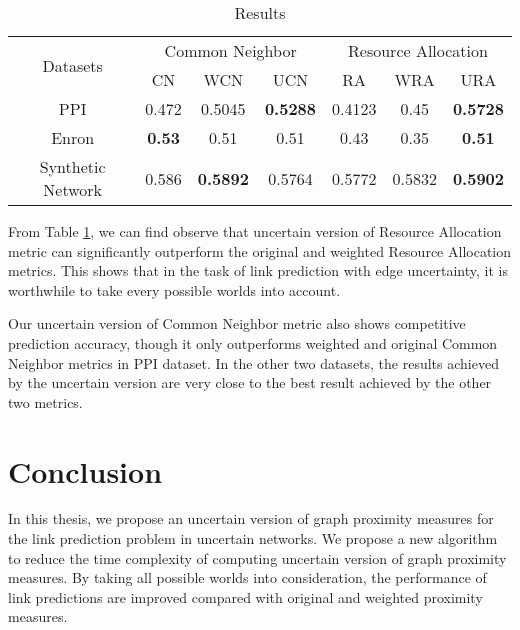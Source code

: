 \documentclass[\main/thesis.tex]{subfiles}
\begin{document}
\begin{table}[]
\centering
\caption{Results}
\label{experiment-result-link}
\begin{tabular}{c|c|c|c||c|c|c}
\hline
\multirow{2}{*}{Datasets} & \multicolumn{3}{c||}{Common Neighbor}              & \multicolumn{3}{c}{Resource Allocation} \\ \cline{2-7} 
                          & CN            & WCN             & UCN             & RA        & WRA      & URA               \\ \hline
PPI                       & 0.472         & 0.5045          & \textbf{0.5288} & 0.4123    & 0.45     & \textbf{0.5728}   \\ \hline
Enron                     & \textbf{0.53} & 0.51            & 0.51            & 0.43      & 0.35     & \textbf{0.51}     \\ \hline
Synthetic Network         & 0.586         & \textbf{0.5892} & 0.5764          & 0.5772    & 0.5832   & \textbf{0.5902}   \\ \hline
\end{tabular}
\end{table}

From Table \ref{experiment-result-link}, we can find observe that uncertain version of Resource Allocation metric can significantly outperform the original and weighted Resource Allocation metrics. This shows that in the task of link prediction with edge uncertainty, it is worthwhile to take every possible worlds into account.

Our uncertain version of Common Neighbor metric also shows competitive prediction accuracy, though it only outperforms weighted and original Common Neighbor metrics in PPI dataset. In the other two datasets, the results achieved by the uncertain version are very close to the best result achieved by the other two metrics.%

\section{Conclusion}
In this thesis, we propose an uncertain version of graph proximity measures for the link prediction problem in uncertain networks. We propose a new algorithm to reduce the time complexity of computing uncertain version of graph proximity measures. By taking all possible worlds into consideration, the performance of link predictions are improved compared with original and weighted proximity measures.
\end{document}
